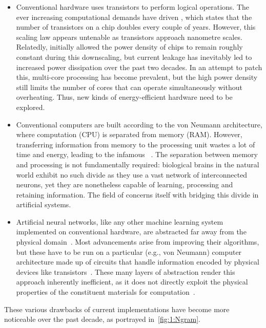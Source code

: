 \begin{itemize}
	\item Conventional hardware uses transistors to perform logical operations.
	The ever increasing computational demands have driven , which states that the number of transistors on a chip doubles every couple of years.
	However, this scaling law appears untenable as transistors approach nanometre scales.
	Relatedly,  initially allowed the power density of chips to remain roughly constant during this downscaling, but current leakage has inevitably led to increased power dissipation over the past two decades.
	In an attempt to patch this, multi-core processing has become prevalent, but the high power density still limits the number of cores that can operate simultaneously without overheating. %
	Thus, new kinds of energy-efficient hardware need to be explored.
	\item Conventional computers are built according to the von Neumann architecture, where computation (CPU) is separated from memory (RAM).
	However, transferring information from memory to the processing unit wastes a lot of time and energy, leading to the infamous ~\cite{TaskAdaptivePRC}.
	The separation between memory and processing is not fundamentally required: biological brains in the natural world exhibit no such divide as they use a vast network of interconnected neurons, yet they are nonetheless capable of learning, processing and retaining information.
	The field of  concerns itself with bridging this divide in artificial systems.
	\item Artificial neural networks, like any other machine learning system implemented on conventional hardware, are abstracted far away from the physical domain~\cite{RC_ASI}.
	Most advancements arise from improving their algorithms, but these have to be run on a particular (e.g., von Neumann) computer architecture made up of circuits that handle information encoded by physical devices like transistors~\cite{RC_SuperconductingElectronics}.
	These many layers of abstraction render this approach inherently inefficient, as it does not directly exploit the physical properties of the constituent materials for computation~\cite{RC_ASI}.
\end{itemize}
These various drawbacks of current implementations have become more noticeable over the past decade, as portrayed in~\cref{fig:1:Ngram}.
